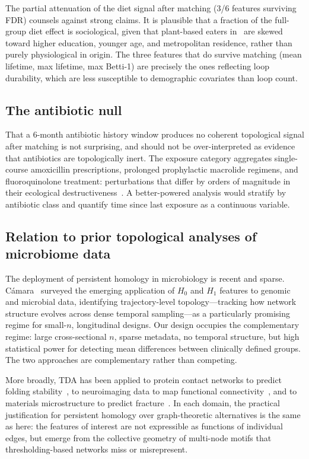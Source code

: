 The partial attenuation of the diet signal after matching (3/6 features
surviving FDR) counsels against strong claims.
It is plausible that a fraction of the full-group diet effect is
sociological, given that plant-based eaters in \agp\ are skewed toward higher
education, younger age, and metropolitan residence, rather than purely
physiological in origin.
The three features that do survive matching (mean lifetime, max
lifetime, max Betti-1) are precisely the ones reflecting loop durability,
which are less susceptible to demographic covariates than loop count.

\subsection{The antibiotic null}

That a 6-month antibiotic history window produces no coherent topological
signal after matching is not surprising, and should not be over-interpreted
as evidence that antibiotics are topologically inert.
The exposure category aggregates single-course amoxicillin prescriptions,
prolonged prophylactic macrolide regimens, and fluoroquinolone treatment:
perturbations that differ by orders of magnitude in their ecological
destructiveness~\citep{petersen2014defining}.
A better-powered analysis would stratify by antibiotic class and quantify
time since last exposure as a continuous variable.

\subsection{Relation to prior topological analyses of microbiome data}

The deployment of persistent homology in microbiology is recent and sparse.
C\'{a}mara~\citep{camara2017topological} surveyed the emerging application
of $H_0$ and $H_1$ features to genomic and microbial data, identifying
trajectory-level topology---tracking how network structure evolves across
dense temporal sampling---as a particularly promising regime for small-$n$,
longitudinal designs.
Our design occupies the complementary regime: large cross-sectional $n$,
sparse metadata, no temporal structure, but high statistical power for
detecting mean differences between clinically defined groups.
The two approaches are complementary rather than competing.

More broadly, TDA has been applied to protein contact networks to predict
folding stability~\citep{wasserman2018topological}, to neuroimaging data to
map functional connectivity~\citep{bubenik2015statistical}, and to materials
microstructure to predict fracture~\citep{ghrist2008barcodes}.
In each domain, the practical justification for persistent homology over
graph-theoretic alternatives is the same as here: the features of interest
are not expressible as functions of individual edges, but emerge from the
collective geometry of multi-node motifs that thresholding-based networks
miss or misrepresent.

